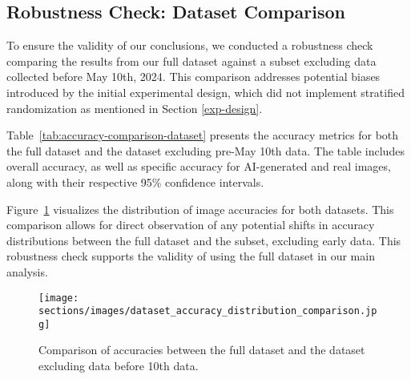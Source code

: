 \subsection{Robustness Check: Dataset Comparison}

To ensure the validity of our conclusions, we conducted a robustness check comparing the results from our full dataset against a subset excluding data collected before May 10th, 2024. This comparison addresses potential biases introduced by the initial experimental design, which did not implement stratified randomization as mentioned in Section \ref{exp-design}.

Table~\ref{tab:accuracy-comparison-dataset} presents the accuracy metrics for both the full dataset and the dataset excluding pre-May 10th data. The table includes overall accuracy, as well as specific accuracy for AI-generated and real images, along with their respective 95\% confidence intervals.

\begin{table}[H]
\centering
\caption{Comparison of accuracy: Full Dataset vs. Dataset excluding data before May 10th}
\label{tab:accuracy-comparison-dataset}
\end{table}

Figure~\ref{fig:accuracy-comparison-dstaset} visualizes the distribution of image accuracies for both datasets. This comparison allows for direct observation of any potential shifts in accuracy distributions between the full dataset and the subset, excluding early data.
 This robustness check supports the validity of using the full dataset in our main analysis.

\begin{figure}[H]
\centering
\texttt{[image: sections/images/dataset\_accuracy\_distribution\_comparison.jpg]}
\vspace{-10mm}
\caption{Comparison of accuracies between the full dataset and the dataset excluding data before 10th data.}
\label{fig:accuracy-comparison-dstaset}
\end{figure}

